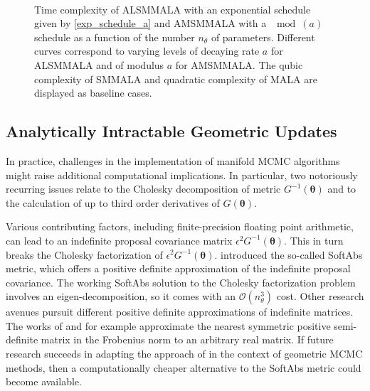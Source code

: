 \documentclass[twoside,11pt]{article}
\begin{document}
{\begin{figure}[t]
	\centering
	 \\
	\caption{
		Time complexity of ALSMMALA with an exponential schedule given by \eqref{exp_schedule_a} and AMSMMALA with a $\mod{(a)}$ 
		schedule as a function of the number $n_{\theta}$ of parameters. Different curves correspond to varying levels of 
		decaying rate $a$ for ALSMMALA and of modulus $a$ for AMSMMALA. The qubic complexity of SMMALA and quadratic complexity
		of MALA are displayed as baseline cases.
	}
	\label{fig:alsmmala_amsmmala_schedule}
\end{figure}

\subsection{Analytically Intractable Geometric Updates}

In practice, challenges in the implementation of manifold MCMC algorithms might raise additional computational implications.
In particular, two notoriously recurring issues relate to the Cholesky decomposition of metric $G^{-1}(\boldsymbol{\theta})$ 
and to the calculation of up to third order derivatives of $G(\boldsymbol{\theta})$.

Various contributing factors, including finite-precision floating point arithmetic, can lead to an indefinite proposal
covariance matrix $\epsilon^2 G^{-1}(\boldsymbol{\theta})$. This in turn breaks the Cholesky factorization of 
$\epsilon^2 G^{-1}(\boldsymbol{\theta})$. \cite{bet__age} introduced the so-called SoftAbs metric, which offers a 
positive definite approximation of the indefinite proposal covariance. The working SoftAbs solution to the Cholesky 
factorization problem involves an eigen-decomposition, so it comes with an $\mathcal{O}(n_{\theta}^3)$ cost.
Other research avenues pursuit different positive definite approximations of indefinite matrices. The works of 
\cite{hig__com01} and \cite{hig__com02} for example approximate the nearest symmetric positive semi-definite matrix in the 
Frobenius norm to an arbitrary real matrix. If future research succeeds in adapting the approach of \cite{hig__com01} in the 
context of geometric MCMC methods, then a computationally cheaper alternative to the SoftAbs metric could become available.

}
\end{document}
